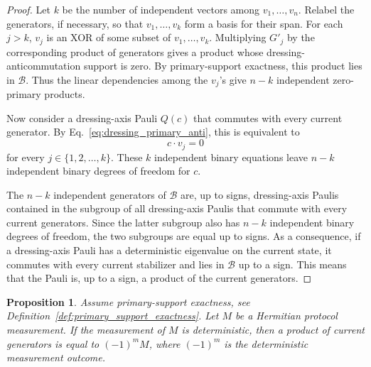 \documentclass[
 reprint,
 amsmath,amssymb,
 pra,superscriptaddress, nofootinbib
]{revtex4-2}
\newtheorem{proposition}{Proposition}
\theoremstyle{definition}
\theoremstyle{plain}
\begin{document}
\begin{proof}
Let $k$ be the number of independent vectors among $v_1,\ldots,v_n$. Relabel the generators, if necessary, so that $v_1,\ldots,v_k$ form a basis for their span.
For each $j>k$, $v_j$ is an XOR of some subset of $v_1,\ldots,v_k$. Multiplying $G'_j$ by the corresponding product of generators gives a product whose dressing-anticommutation support is zero. 
By primary-support exactness, this product lies in $\mathcal{B}$.
Thus the linear dependencies among the $v_j$'s give $n-k$ independent zero-primary products. 

Now consider a dressing-axis Pauli $Q(c)$ that commutes with every current generator. By Eq.~\eqref{eq:dressing_primary_anti}, this is equivalent to
\begin{equation}
  c\cdot v_j=0
\end{equation}
for every $j \in \{1,2,\ldots,k\}$. These $k$ independent binary equations leave $n-k$ independent binary degrees of freedom for $c$. 

The $n-k$ independent generators of $\mathcal{B}$ are, up to signs, dressing-axis Paulis contained in the subgroup of all dressing-axis Paulis that commute with every current generators. Since the latter subgroup also has $n-k$ independent binary degrees of freedom, the two subgroups are equal up to signs. As a consequence, if a dressing-axis Pauli has a deterministic eigenvalue on the current state, it commutes with every current stabilizer and lies in $\mathcal{B}$ up to a sign. This means that the Pauli is, up to a sign, a product of the current generators.
\end{proof}

\begin{proposition}
\label{prop:deterministic}
Assume primary-support exactness, see Definition~\ref{def:primary_support_exactness}. Let $M$ be a Hermitian protocol measurement. If the measurement of $M$ is deterministic, then a product of current generators is equal to $(-1)^m M$, where $(-1)^m$ is the deterministic measurement outcome.
\end{proposition}
\end{document}
